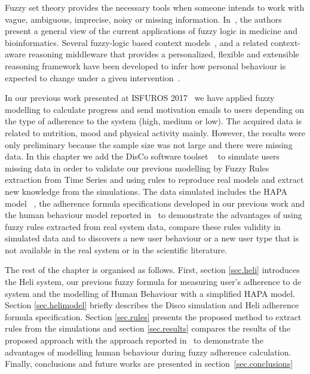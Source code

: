 \documentclass[graybox]{svmult}
\begin{document}
Fuzzy set theory provides the necessary tools when someone intends to work with vague, ambiguous, imprecise, noisy or missing information\cite{Gursel2016, Bingchuan2012, Giabbanelli2014, Giabbanelli2006}. In~\cite{Giabbanelli2006}, the authors present a general view of the current applications of fuzzy logic in medicine and bioinformatics. Several fuzzy-logic based context models~\cite{Bingchuan2012}, and a related context-aware reasoning middleware that provides a personalized, flexible and extensible reasoning framework have been developed to infer how personal behaviour is expected to change under a given intervention~\cite{Giabbanelli2014}. 


In our previous work  presented at ISFUROS 2017~\cite{rem2017} we have applied fuzzy modelling to calculate progress and send motivation emails to users depending on the type of adherence to the system (high, medium or low). The acquired data is related to nutrition, mood and physical activity mainly. However, the results were only preliminary because the sample size was not large and there were missing data. In this chapter we add the DisCo software toolset ~\cite{Disco} to simulate users missing data in order to validate our previous modelling by Fuzzy Rules extraction from Time Series and using rules to reproduce real models and extract new knowledge from the simulations. 
The data simulated includes the HAPA model ~\cite{MacPhail}, the adherence formula specifications developed in our previous work and the human behaviour model reported in~\cite{Brailsford2016}
to demonstrate the advantages of using fuzzy rules extracted from real system data, compare these rules validity in simulated data  and to discovers a new user behaviour or a new user type that is not available in the real system or in the scientific literature.

The rest of the chapter is organised as follows. First, section \ref{sec.heli} introduces the Heli system, our previous fuzzy formula for measuring user's adherence to de system and the modelling of Human Behaviour with a simplified HAPA model. Section \ref{sec.helimodel} briefly describes the Disco simulation and Heli adherence formula specification. Section \ref{sec.rules} presents the proposed method to extract rules from the simulations and section \ref{sec.results} compares the results of the proposed approach with the approach reported in~\cite{Brailsford2016} to demonstrate the advantages of modelling human behaviour during fuzzy adherence calculation. Finally, conclusions and future works are presented in section~\ref{sec.conclusions}
\end{document}
